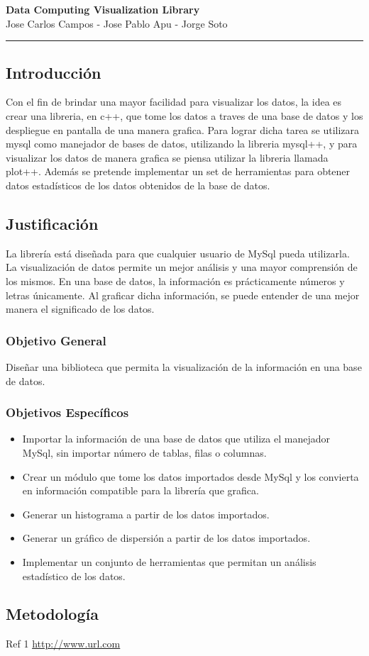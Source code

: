 \documentclass[11pt]{article}
\begin{document}
\begin{center}
{ \huge \bfseries Data Computing Visualization Library }\\[0.2cm]
{ Jose Carlos Campos - Jose Pablo Apu - Jorge Soto }\\[0.2cm]
\rule{\linewidth}{0.25mm}
\end{center}

\subsection*{Introducción}
Con el fin de brindar una mayor facilidad para visualizar los datos, la idea es crear una libreria, en c++, que tome los datos a traves de una base de datos y los despliegue en pantalla de una manera grafica. Para lograr dicha tarea se utilizara mysql como manejador de bases de datos, utilizando la libreria mysql++, y para visualizar los datos de manera grafica se piensa utilizar la libreria llamada plot++. Además se pretende implementar un set de herramientas para obtener datos estadísticos de los datos obtenidos de la base de datos. 

\subsection*{Justificación}
La librería está diseñada para que cualquier usuario de MySql pueda utilizarla. La visualización de datos permite un mejor análisis y una mayor comprensión de los mismos. En una base de datos, la información es prácticamente números y letras únicamente. Al graficar dicha información, se puede entender de una mejor manera el significado de los datos.

\subsubsection*{Objetivo General}
Diseñar una biblioteca que permita la visualización de la información en una base de datos.

\subsubsection*{Objetivos Específicos}
\begin{itemize}
\item Importar la información de una base de datos que utiliza el manejador MySql, sin importar número de tablas, filas o columnas.
\item Crear un módulo que tome los datos importados desde MySql y los convierta en información compatible para la librería que grafica.
\item Generar un histograma a partir de los datos importados.
\item Generar un gráfico de dispersión a partir de los datos importados.
\item Implementar un conjunto de herramientas que permitan un análisis estadístico de los datos.
\end{itemize}
\subsection*{Metodología}

\begin{thebibliography}{10}
Ref 1
\url{http://www.url.com}
\end{thebibliography}
\end{document}
